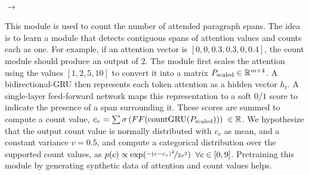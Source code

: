 \documentclass[main.tex]{subfiles}
\begin{document}
\paragraph{ $\rightarrow$ \typeCount}\mbox{}%
\noindent
This module is used to count the number of attended paragraph spans. The idea is to learn a module that detects contiguous spans of attention values and counts each as one. For example, if an attention vector is $[0, 0, 0.3, 0.3, 0, 0.4]$, the count module should produce an output of $2$.
%
The module first scales the attention using the values $[1, 2, 5, 10]$ to convert it into a matrix $P_{\text{scaled}} \in \mathbb{R}^{m \times 4}$.
A bidirectional-GRU then represents each token attention as a hidden vector $h_{t}$. A single-layer feed-forward network maps this representation to a soft $0$/$1$ score to indicate the presence of a span surrounding it. These scores are summed to compute a count value, $c_{v} =\sum \sigma \left( FF (\text{countGRU}(P_{\text{scaled}})) \right) \; \in  \mathbb{R}$.
We hypothesize that the output count value is normally distributed with $c_{v}$ as mean, and a constant variance $v=0.5$, and compute a categorical distribution over the supported count values, as $p(c) \propto \exp ( \nicefrac{-(c - c_{v})^2}{2v^{2}} ) \;\; \forall c \in [0, 9]$.
Pretraining this module by generating synthetic data of attention and count values helps. %

\end{document}
